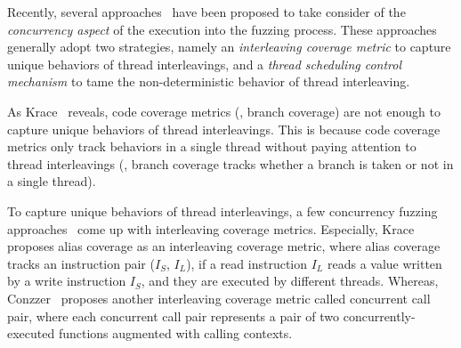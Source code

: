 Recently, several approaches~\cite{razzer, krace, snowboard, muzz}
have been proposed to take consider of the \textit{concurrency aspect}
of the execution into the fuzzing process.
%
These approaches generally adopt two strategies, namely an
\textit{interleaving coverage metric} to capture unique behaviors of
thread interleavings, and a \textit{thread scheduling control
  mechanism} to tame the non-deterministic behavior of thread
interleaving.







%
As Krace~\cite{krace} reveals, code coverage metrics (\eg, branch
coverage) are not enough to capture unique behaviors of thread
interleavings. This is because code coverage metrics only track
behaviors in a single thread without paying attention to thread
interleavings (\eg, branch coverage tracks whether a branch is taken
or not in a single thread).


To capture unique behaviors of thread interleavings, a few concurrency
fuzzing approaches~\cite{conzzer, krace} come up with interleaving
coverage metrics.
%
Especially, Krace~\cite{krace} proposes alias coverage as an
interleaving coverage metric, where alias coverage tracks an
instruction pair ($I_S$, $I_L$), if a read instruction $I_L$ reads a
value written by a write instruction $I_S$, and they are executed by
different threads.
%
Whereas, Conzzer~\cite{conzzer} proposes another interleaving coverage
metric called concurrent call pair, where each concurrent call pair
represents a pair of two concurrently-executed functions augmented
with calling contexts.

